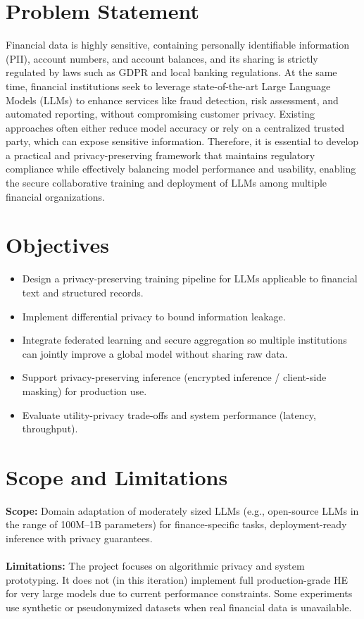 \documentclass[12pt,a4paper]{report}
\begin{document}
\section{Problem Statement}
Financial data is highly sensitive, containing personally identifiable information (PII), account numbers, and account balances, and its sharing is strictly regulated by laws such as GDPR and local banking regulations. At the same time, financial institutions seek to leverage state-of-the-art Large Language Models (LLMs) to enhance services like fraud detection, risk assessment, and automated reporting, without compromising customer privacy. Existing approaches often either reduce model accuracy or rely on a centralized trusted party, which can expose sensitive information. Therefore, it is essential to develop a practical and privacy-preserving framework that maintains regulatory compliance while effectively balancing model performance and usability, enabling the secure collaborative training and deployment of LLMs among multiple financial organizations. 



\section{Objectives}
\begin{itemize}
    \item Design a privacy-preserving training pipeline for LLMs applicable to financial text and structured records.
    \item Implement differential privacy to bound information leakage.
    \item Integrate federated learning and secure aggregation so multiple institutions can jointly improve a global model without sharing raw data.
    \item Support privacy-preserving inference (encrypted inference / client-side masking) for production use.
    \item Evaluate utility-privacy trade-offs and system performance (latency, throughput).
\end{itemize}

\section{Scope and Limitations}
\textbf{Scope:} Domain adaptation of moderately sized LLMs (e.g., open-source LLMs in the range of 100M–1B parameters) for finance-specific tasks, deployment-ready inference with privacy guarantees. \\
\textbf \\ \textbf{Limitations:} The project focuses on algorithmic privacy and system prototyping. 
It does not (in this iteration) implement full production-grade HE for very large models 
due to current performance constraints. Some experiments use synthetic or pseudonymized 
datasets when real financial data is unavailable.
\end{document}
